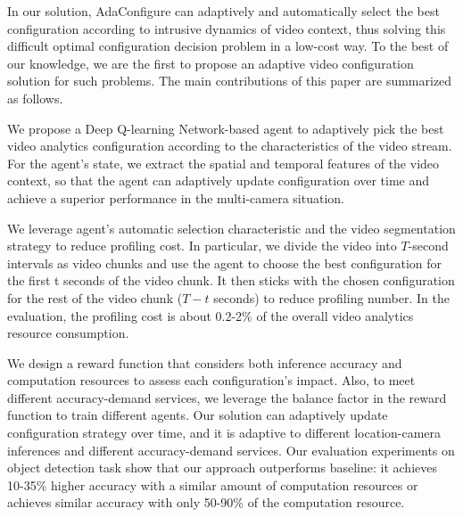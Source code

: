 In our solution, AdaConfigure can adaptively and automatically select the best configuration according to intrusive dynamics of video context, thus solving this difficult optimal configuration decision problem in a low-cost way. To the best of our knowledge, we are the first to propose an adaptive video configuration solution for such problems. 
The main contributions of this paper are summarized as follows. 

We propose a Deep Q-learning Network-based \cite{DQN} agent to adaptively pick the best video analytics configuration according to the characteristics of the video stream. For the agent's state, we extract the spatial and temporal features of the video context, so that the agent can adaptively update configuration over time and achieve a superior performance in the multi-camera situation. 

We leverage  agent's automatic selection characteristic and the video segmentation strategy to reduce profiling cost. In particular, we divide the video into $T$-second intervals as video chunks and use the agent to choose the best configuration for the first t seconds of the video chunk. It then sticks with the chosen configuration for the rest of the video chunk ($T-t$ seconds) to reduce profiling number. In the evaluation, the profiling cost is about 0.2-2\% of the overall video analytics resource consumption. 

We design a reward function that considers both inference accuracy and computation resources to assess each configuration's impact. Also, to meet different accuracy-demand services, we leverage the balance factor in the reward function to train different agents. Our solution can adaptively update configuration strategy over time, and it is adaptive to different location-camera inferences and different accuracy-demand services. Our evaluation experiments on object detection task show that our approach outperforms baseline: it achieves 10-35\% higher accuracy with a similar amount of computation resources or achieves similar accuracy with only 50-90\% of the computation resource.

